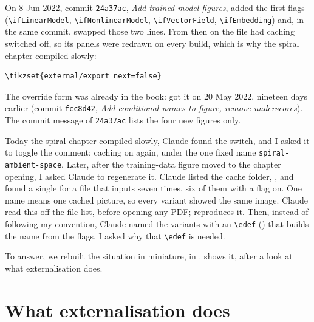 \documentclass[11pt,a4paper]{article}
\let\sectionalone\section
\renewcommand{\section}{\needspace{8\baselineskip}\sectionalone}
\newcommand{\cs}[1]{\texttt{\textbackslash #1}}
\newcommand{\flagif}[1]{\texttt{\lstflagif{#1}{}}}
\newcommand{\lstflagif}[2]{{\color{orange!85!black}\textbackslash if}{\color{teal!80!black}#1}}
\begin{document}
On 8 Jun 2022, commit \texttt{24a37ac}, \textit{Add trained model figures}, added the first flags (\flagif{LinearModel}, \flagif{NonlinearModel}, \flagif{VectorField}, \flagif{Embedding}) and, in the same commit, swapped those two lines. From then on the file had caching switched off, so its  panels were redrawn on every build, which is why the spiral chapter compiled slowly:

\begin{lstlisting}[style=latex]
%\tikzsetnextfilename{spiral-ambient-space}
\tikzset{external/export next=false}
\end{lstlisting}

The override form was already in the book:  got it on 20 May 2022, nineteen days earlier (commit \texttt{fcc8d42}, \textit{Add conditional names to figure, remove underscores}). The commit message of \texttt{24a37ac} lists the four new figures only.

Today the spiral chapter compiled slowly, Claude found the switch, and I asked it to toggle the comment: caching on again, under the one fixed name \texttt{spiral-ambient-space}. Later, after the training-data figure moved to the chapter opening, I asked Claude to regenerate it. Claude listed the cache folder, , and found a single  for a file that  inputs seven times, six of them with a flag on. One name means one cached picture, so every variant showed the same image. Claude read this off the file list, before opening any PDF;  reproduces it. Then, instead of following my convention, Claude named the variants with an \cs{edef} () that builds the name from the flags. I asked why that \cs{edef} is needed.

To answer, we rebuilt the situation in miniature, in .  shows it, after a look at what externalisation does.

\section{What externalisation does}
\end{document}
